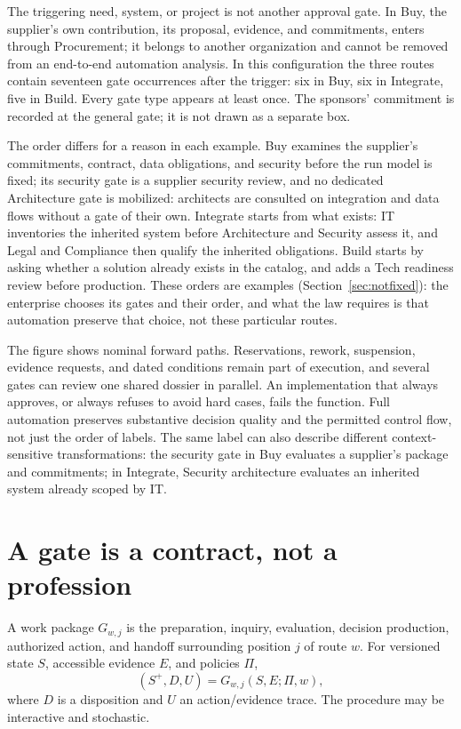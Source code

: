 The triggering need, system, or project is not another approval gate. In Buy, the supplier's own
contribution, its proposal, evidence, and commitments, enters through Procurement; it belongs to another
organization and cannot be removed from an end-to-end automation analysis. In this configuration the
three routes contain seventeen gate occurrences after the trigger: six in Buy, six in Integrate, five
in Build. Every gate type appears at least once. The sponsors' commitment is recorded at the general
gate; it is not drawn as a separate box.

The order differs for a reason in each example. Buy examines the supplier's commitments, contract, data
obligations, and security before the run model is fixed; its security gate is a supplier security review,
and no dedicated Architecture gate is mobilized: architects are consulted on integration and data flows
without a gate of their own. Integrate starts from
what exists: IT inventories the inherited system before Architecture and Security assess it, and Legal
and Compliance then qualify the inherited obligations. Build starts by asking whether a solution
already exists in the catalog, and adds a Tech readiness review before production. These orders are
examples (Section~\ref{sec:notfixed}): the enterprise chooses its gates and their order, and what the
law requires is that automation preserve that choice, not these particular routes.

The figure shows nominal forward paths. Reservations, rework, suspension, evidence requests, and dated
conditions remain part of execution, and several gates can review one shared dossier in parallel.
An implementation that always approves, or always refuses to avoid hard cases, fails the function. Full
automation preserves substantive decision quality and the permitted control flow, not just the order of
labels. The same label can also describe different context-sensitive transformations: the security gate in Buy evaluates a supplier's package and commitments; in Integrate, Security
architecture evaluates an inherited system already scoped by IT.

\section{A gate is a contract, not a profession}
\label{sec:contract}

\begin{definition}
A work package $G_{w,j}$ is the preparation, inquiry, evaluation, decision production, authorized
action, and handoff surrounding position $j$ of route $w$. For versioned state $S$, accessible evidence
$E$, and policies $\Pi$,
\begin{equation}
(S^{+}, D, U) = G_{w,j}(S, E; \Pi, w), \label{eq:gate}
\end{equation}
where $D$ is a disposition and $U$ an action/evidence trace. The procedure may be interactive and
stochastic.
\end{definition}

